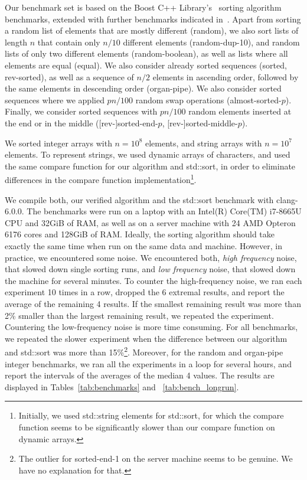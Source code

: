 \documentclass[sigplan,10pt,anonymous,review]{acmart}\settopmatter{printfolios=true,printccs=false,printacmref=false}
\theoremstyle{definition}
\begin{document}
  Our benchmark set is based on the Boost C++ Library's~\cite{boost} sorting algorithm benchmarks, extended with further benchmarks indicated in~\cite{Bent93}.
  Apart from sorting a random list of elements that are mostly different (random), we also sort lists of length $n$ that contain only $n/10$ different elements (random-dup-10), and random lists of only two different elements (random-boolean), as well as lists where all elements are equal (equal).
  We also consider already sorted sequences (sorted, rev-sorted), as well as a sequence of $n/2$ elements in ascending order, followed by the same elements in descending order (organ-pipe). We also consider sorted sequences where we applied $pn/100$ random swap operations (almost-sorted-$p$).
  Finally, we consider sorted sequences with $pn/100$ random elements inserted at the end or in the middle ([rev-]sorted-end-$p$, [rev-]sorted-middle-$p$).

  We sorted integer arrays with $n=10^8$ elements, and string arrays with $n=10^7$ elements.
  To represent strings, we used dynamic arrays of characters, and used the same compare function for our algorithm and std::sort,
  in order to eliminate differences in the compare function implementation\footnote{Initially, we used std::string elements for std::sort,
  for which the compare function seems to be significantly slower than our compare function on dynamic arrays.}.

  We compile both, our verified algorithm and the std::sort benchmark with clang-6.0.0.
  The benchmarks were run on a laptop with an Intel(R) Core(TM) i7-8665U CPU and 32GiB of RAM, as well as on a server machine with
  24 AMD Opteron 6176 cores and 128GiB of RAM. Ideally, the sorting algorithm should take exactly the same time when run on the same data and machine.
  However, in practice, we encountered some noise. We encountered both, \emph{high frequency} noise, that slowed down single sorting
  runs, and \emph{low frequency} noise, that slowed down the machine for several minutes. To counter the high-frequency noise,
  we ran each experiment 10 times in a row, dropped the 6 extremal results, and report the average of the remaining 4 results.
  If the smallest remaining result was more than 2\% smaller than the largest remaining result, we repeated the experiment.
  Countering the low-frequency noise is more time consuming. For all benchmarks, we repeated the slower experiment when the
  difference between our algorithm and std::sort was more than 15\%\footnote{The outlier for sorted-end-1 on the server machine seems to be genuine. We have no explanation for that.}. Moreover, for the random and organ-pipe integer benchmarks,
  we ran all the experiments in a loop for several hours, and report the intervals of the averages of the median 4 values.
  The results are displayed in Tables~\ref{tab:benchmarks} and ~\ref{tab:bench_longrun}.
\end{document}
